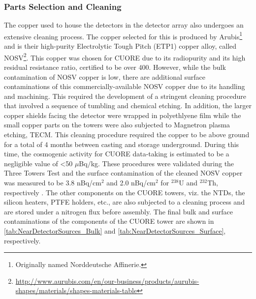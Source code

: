\subsubsection{Parts Selection and Cleaning}
\label{ssec:Parts Selection and Cleaning}
The copper used to house the detectors in the detector array also undergoes an extensive cleaning process.
The copper selected for this is produced by Arubis\footnote{Originally named Norddeutsche Affinerie.} and is their high-purity Electrolytic Tough Pitch (ETP1) copper alloy, called NOSV\footnote{\RaggedRight\url{http://www.aurubis.com/en/our-business/products/aurubis-shapes/materials/shapes-materials-table}}.
This copper was chosen for CUORE due to its radiopurity and its high residual resistance ratio, certified to be over 400.
However, while the bulk contamination of NOSV copper is low, there are additional surface contaminations of this commercially-available NOSV copper due to its handling and machining.
This required the development of a stringent cleaning procedure that involved a sequence of tumbling and chemical etching.
In addition, the larger copper shields facing the detector were wrapped in polyethlyene film while the small copper parts on the towers were also subjected to Magnetron plasma etching, TECM.
This cleaning procedure required the copper to be above ground for a total of 4 months between casting and storage underground.
During this time, the cosmogenic activity for CUORE data-taking is estimated to be a negligible value of <50 $\mu$Bq$/$kg.
These procedures were validated during the Three Towers Test  and the surface contamination of the cleaned NOSV copper was measured to be 3.8 nBq/cm$^2$ and 2.0 nBq/cm$^2$ for $^{238}$U and $^{232}$Th, respectively \cite{ALESSANDRIA201313}.
The other components on the CUORE towers, viz. the NTDs, the silicon heaters, PTFE holders, etc., are also subjected to a cleaning process and are stored under a nitrogen flux before assembly.
The final bulk and surface contaminations of the components of the CUORE tower are shown in \autoref{tab:NearDetectorSources_Bulk} and \autoref{tab:NearDetectorSources_Surface}, respectively.


